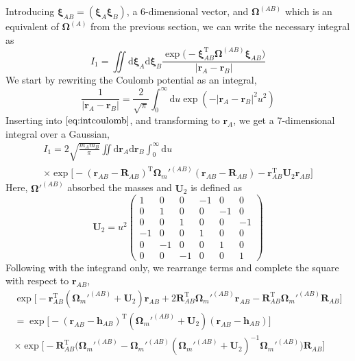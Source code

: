 Introducing $\boldsymbol\xi_{AB}=(\boldsymbol\xi_A\boldsymbol\xi_B)$, a 6-dimensional vector, and $\boldsymbol\Omega^{(AB)}$ which is an equivalent of $\boldsymbol\Omega^{(A)}$ from the previous section, we can write the necessary integral as
\begin{equation}
I_1=\iint\mathrm d\boldsymbol\xi_A\mathrm d\boldsymbol\xi_B \frac{\exp\big(-\boldsymbol\xi_{AB}^\mathrm T\boldsymbol\Omega^{(AB)}\boldsymbol\xi_{AB}\big)}{\lvert\mathbf r_A-\mathbf r_B\rvert}
\label{eq:intcoulomb}
\end{equation}
We start by rewriting the Coulomb potential as an integral,
\begin{equation}
\frac1{\lvert\mathbf r_A-\mathbf r_B\rvert}=\frac2{\sqrt\pi}\int_0^\infty\mathrm du\exp(-\lvert\mathbf r_A-\mathbf r_B\rvert^2u^2)
\end{equation}
Inserting into $\eqref{eq:intcoulomb}$, and transforming to $\mathbf r_A$, we get a 7-dimensional integral over a Gaussian,
\begin{multline}
I_1=2\sqrt{\frac{m_A m_B}\pi}\iint\mathrm d\mathbf r_A\mathrm d\mathbf r_B\int_0^\infty\mathrm du \\
\times\exp\big[-(\mathbf r_{AB}-\mathbf R_{AB})^\mathrm T\boldsymbol\Omega_m'^{(AB)}(\mathbf r_{AB}-\mathbf R_{AB})-\mathbf r_{AB}^\mathrm T\mathbf U_2\mathbf r_{AB}\big]
\end{multline}
Here, $\boldsymbol\Omega'^{(AB)}$ absorbed the masses and $\mathbf U_2$ is defined as
\begin{equation}
\mathbf U_2=u^2\begin{pmatrix}
1&0&0&-1&0&0\\
0&1&0&0&-1&0\\
0&0&1&0&0&-1\\
-1&0&0&1&0&0\\
0&-1&0&0&1&0\\
0&0&-1&0&0&1
\end{pmatrix}
\end{equation}
Following with the integrand only, we rearrange terms and complete the square with respect to $\mathbf r_{AB}$,
\begin{multline}
\exp\big[-\mathbf r_{AB}^\mathrm T(\boldsymbol\Omega_m'^{(AB)}+\mathbf U_2)\mathbf r_{AB}+2\mathbf R_{AB}^\mathrm T\boldsymbol\Omega_m'^{(AB)}\mathbf r_{AB}-\mathbf R_{AB}^\mathrm T\boldsymbol\Omega_m'^{(AB)}\mathbf R_{AB}\big] \\
=\exp\big[-(\mathbf r_{AB}-\mathbf h_{AB})^\mathrm T(\boldsymbol\Omega_m'^{(AB)}+\mathbf U_2)(\mathbf r_{AB}-\mathbf h_{AB})\big] \\
\times\exp\big[-\mathbf R_{AB}^\mathrm T\big(\boldsymbol\Omega_m'^{(AB)}-\boldsymbol\Omega_m'^{(AB)}(\boldsymbol\Omega_m'^{(AB)}+\mathbf U_2)^{-1}\boldsymbol\Omega_m'^{(AB)}\big)\mathbf R_{AB}\big]
\end{multline}

